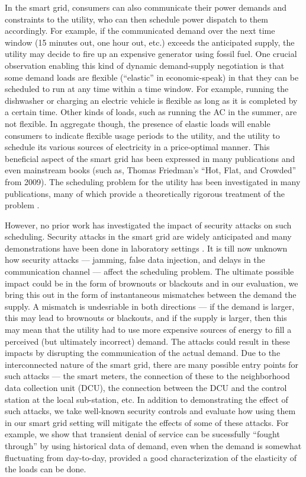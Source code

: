 \documentclass[conference]{IEEEtran}
\begin{document}
In the smart grid, consumers can also communicate their power demands and constraints to the utility, who can then schedule
power dispatch to them accordingly.  For example, if the communicated demand over the next time window (15 minutes out, one hour out, etc.) exceeds the anticipated supply, the utility may decide to fire up an expensive generator using fossil fuel. One crucial observation enabling this kind of dynamic demand-supply negotiation is that some demand loads are flexible (``elastic'' in economic-speak) in that they can be scheduled to run at any time within a time window. For example, running the dishwasher or charging an electric vehicle is flexible as long as it is completed by a certain time. Other kinds of loads, such as running the AC in the summer, are not flexible. In aggregate though, the presence of elastic loads will enable consumers to indicate flexible usage periods to the utility, and the utility to schedule its various sources of electricity in a price-optimal manner. This beneficial aspect of the smart grid has been expressed in many publications and even mainstream books (such as, Thomas Friedman's ``Hot, Flat, and Crowded'' from 2009). The scheduling problem for the utility has been investigated in many publications, many of which provide a theoretically rigorous treatment of the problem \cite{pertersen2013taxonomy}. 

However, no prior work has investigated the impact of security attacks on such scheduling. Security attacks in the smart grid are widely anticipated \cite{nist} and many demonstrations have been done in laboratory settings \cite{hussain2012ncs}. It is till now unknown how security attacks --- jamming, false data injection, and delays in the communication channel --- affect the scheduling problem. The ultimate possible impact could be in the form of brownouts or blackouts and in our evaluation, we bring this out in the form of instantaneous mismatches between the demand the supply. A mismatch is undesriable in both directions --- if the demand is larger, this may lead to brownouts or blackouts, and if the supply is larger, then this may mean that the utility had to use more expensive sources of energy to fill a perceived (but ultimately incorrect) demand. The attacks could result in these impacts by disrupting the communication of the actual demand. Due to the interconnected nature of the smart grid, there are many possible entry points for such attacks --- the smart meters, the connection of these to the neighborhood data collection unit (DCU), the connection between the DCU and the control station at the local sub-station, etc. In addition to demonstrating the effect of such attacks, we take well-known security controls and evaluate how using them in our smart grid setting will mitigate the effects of some of these attacks. For example, we show that transient denial of service can be sucessfully ``fought through'' by using historical data of demand, even when the demand is somewhat fluctuating from day-to-day, provided a good characterization of the elasticity of the loads can be done. 
\end{document}
